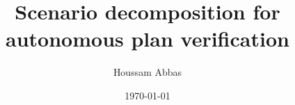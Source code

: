 \documentclass[11pt, oneside, reqno]{article}
\begin{document}
\title{Scenario decomposition for autonomous plan verification}
\author{Houssam Abbas}
\date{\today}
\maketitle
\tableofcontents





\appendix





\end{document}
